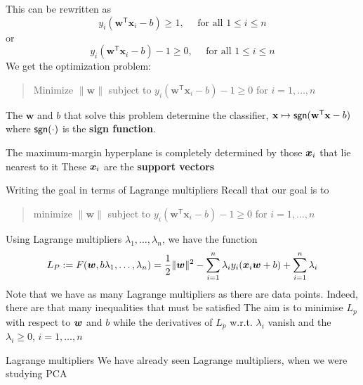 \documentclass[aspectratio=169]{beamer}\usepackage[]{graphicx}\usepackage[]{xcolor}
\begin{document}
\begin{frame}
    This can be rewritten as
    \[
        y_i(\mathbf{w}^\mathsf{T} \mathbf{x}_i - b) \ge 1, \quad \text{ for all } 1 \le i \le n
    \]
    or
    \[
        y_i(\mathbf{w}^\mathsf{T} \mathbf{x}_i - b)-1\geq 0, \quad \text{ for all } 1 \le i \le n
    \]
    \vfill
    We get the optimization problem:
    \begin{quote}
        Minimize $\|\mathbf{w}\|$ subject to $y_i(\mathbf{w}^\mathsf{T} \mathbf{x}_i - b)-1 \ge 0$ for $i = 1, \ldots, n$
    \end{quote}
    \vfill
    The $\mathbf{w}$ and $b$ that solve this problem determine the classifier, $\mathbf{x} \mapsto \mathsf{sgn}(\mathbf{w}^\mathsf{T} \mathbf{x} - b)$ where $\mathsf{sgn}(\cdot)$ is the \textbf{sign function}.
\end{frame}

\begin{frame}   
    The maximum-margin hyperplane is completely determined by those $\bm{x}_i$ that lie nearest to it
    \vfill
    These $\bm{x}_i$ are the \textbf{support vectors}
\end{frame}

\begin{frame}{Writing the goal in terms of Lagrange multipliers}
    Recall that our goal is to
    \begin{quote}
        minimize $\|\mathbf{w}\|$ subject to $y_i(\mathbf{w}^\mathsf{T} \mathbf{x}_i - b)-1 \ge 0$ for $i = 1, \ldots, n$
    \end{quote}
    \vfill
    Using Lagrange multipliers $\lambda_1,\ldots,\lambda_n$, we have the function
    \[
        L_P:=F(\bm{w},b\lambda_1,\ldots,\lambda_n) =
        \frac 12\|\bm{w}\|^2 -\sum_{i=1}^n \lambda_iy_i(\bm{x}_i\bm{w}+b)
        +\sum_{i=1}^n\lambda_i
    \]
    \vfill
    Note that we have as many Lagrange multipliers as there are data points. Indeed, there are that many inequalities that must be satisfied
    \vfill 
    The aim is to minimise $L_p$ with respect to $\bm{w}$ and $b$ while the derivatives of $L_p$ w.r.t. $\lambda_i$ vanish and the $\lambda_i\geq 0$, $i=1,\ldots,n$
\end{frame}

\begin{frame}{Lagrange multipliers}
    We have already seen Lagrange multipliers, when we were studying PCA
    \vfill
\end{frame}
\end{document}
